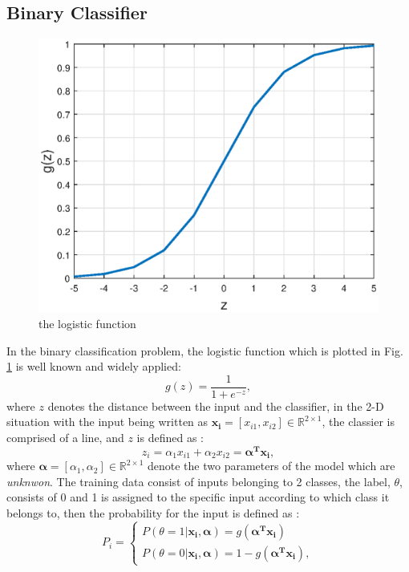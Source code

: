 \documentclass[journal]{IEEEtran}
\begin{document}
\subsection{Binary Classifier} 
\begin{figure}[t]
	\centering
	\includegraphics[width=0.8\columnwidth]{logistic_function}
	\caption{the logistic function}
	\label{fig:logistic_function}
\end{figure}
In the binary classification problem, the logistic function which is plotted in Fig. \ref{fig:logistic_function} is well known and widely applied:
\begin{equation} \label{eqt:logistic_fucntion}
g(z) = \frac{1}{1+e^{-z}},
\end{equation}
where $z$ denotes the distance between the input and the classifier, in the 2-D situation with the input being written as $\boldsymbol{x_{i}} = [x_{i1}, x_{i2}] \in  \mathbb{R}^{2 \times 1}$, the classier is comprised of a line, and $z$ is defined as :
\begin{equation} \label{eqt:z_definition}
z_{i} = \alpha_{1}x_{i1} + \alpha_{2}x_{i2} = \boldsymbol{\alpha^{T} x_{i}},
\end{equation}
where $\boldsymbol{\alpha} = [\alpha_{1}, \alpha_{2}] \in  \mathbb{R}^{2 \times 1}$ denote the two parameters of the model which are \textit{unknwon}. The training data consist of inputs belonging to 2 classes, the label, $\theta$, consists of 0 and 1 is assigned to the specific input according to which class it belongs to, then the probability for the input is defined as :
\begin{equation} \label{eqt:probability}
P_{i} = \left\{\begin{matrix}
P(\theta = 1 | \boldsymbol{x_{i},\alpha}) = g(\boldsymbol{\alpha^{T} x_{i}})\\ 
P(\theta = 0 | \boldsymbol{x_{i},\alpha}) = 1 -g(\boldsymbol{\alpha^{T} x_{i}}),
\end{matrix}\right.
\end{equation}
\end{document}
